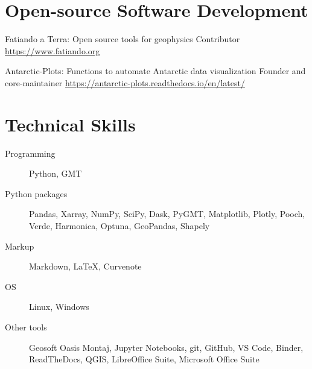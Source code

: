 \documentclass{ExpressiveResume}
\begin{document}
\begin{cventries}


\end{cventries}


\vspace{-1em}
\section{Open-source Software Development}
\begin{cventries}
    {Fatiando a Terra: Open source tools for geophysics}
    {Contributor \newline \url{https://www.fatiando.org}}

    {Antarctic-Plots: Functions to automate Antarctic data visualization}
    {Founder and core-maintainer \newline \url{https://antarctic-plots.readthedocs.io/en/latest/}}
\end{cventries}


\section{Technical Skills}
\begin{description}
    \item[Programming] Python, GMT
    \item[Python packages] Pandas, Xarray, NumPy, SciPy, Dask, PyGMT,
        Matplotlib, Plotly, Pooch, Verde, Harmonica, Optuna, GeoPandas, Shapely
    \item[Markup] Markdown, \LaTeX, Curvenote
    \item[OS] Linux, Windows
    \item[Other tools] Geosoft Oasis Montaj, Jupyter Notebooks, git,
        GitHub, VS Code, Binder,
        ReadTheDocs, QGIS, LibreOffice Suite, Microsoft Office Suite
\end{description}
\vspace{3em}
\end{document}
